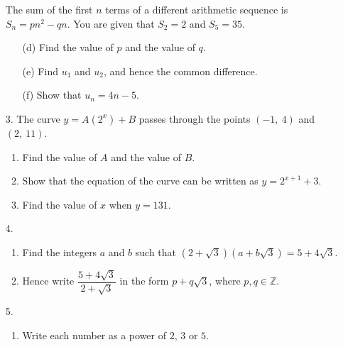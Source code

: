 \documentclass[12pt, twoside]{article}
\begin{document}
\begin{enumerate}[itemsep=0.15cm]
The sum of the first $n$ terms of a different arithmetic sequence is
$S_{n} = pn^{2} - qn$. You are given that $S_{2} = 2$ and $S_{5} = 35$.

\begin{enumerate}[itemsep=0.15cm]
  \item[(d)] Find the value of $p$ and the value of $q$. \vfill
  \item[(e)] Find $u_{1}$ and $u_{2}$, and hence the common difference.
  \vfill
  \item[(f)] Show that $u_{n} = 4n - 5$. \vfill
\end{enumerate}

\newpage

\item[3.]
The curve $y = A\left(2^{x}\right) + B$ passes through the points
$(-1,\ 4)$ and $(2,\ 11)$.

\begin{enumerate}[itemsep=0.15cm]
  \item Find the value of $A$ and the value of $B$. \vfill
  \item Show that the equation of the curve can be written as
  $y = 2^{x + 1} + 3$. \vfill
  \item Find the value of $x$ when $y = 131$. \vfill
\end{enumerate}

\item[4.]
\begin{enumerate}[itemsep=0.15cm]
  \item Find the integers $a$ and $b$ such that
  $\left(2 + \sqrt{3}\right)\left(a + b\sqrt{3}\right) = 5 + 4\sqrt{3}$.
  \vfill
  \item Hence write $\dfrac{5 + 4\sqrt{3}}{2 + \sqrt{3}}$ in the form
  $p + q\sqrt{3}$, where $p, q \in \mathbb{Z}$. \vfill
\end{enumerate}

\newpage

\item[5.]
\begin{enumerate}[itemsep=0.15cm]
  \item Write each number as a power of $2$, $3$ or $5$.


\end{enumerate}
\end{enumerate}
\end{document}
